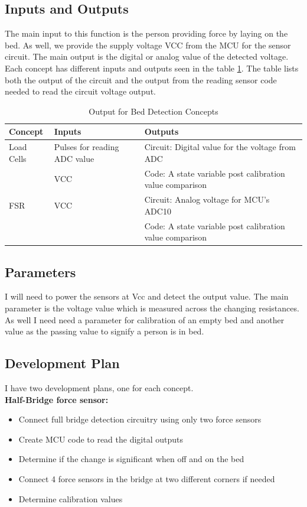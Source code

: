 \documentclass[11pt]{article}
\begin{document}
\subsection*{Inputs and Outputs}
The main input to this function is the person providing force by laying on the bed.
As well, we provide the supply voltage VCC from the MCU for the sensor circuit.
The main output is the digital or analog value of the detected voltage.
Each concept has different inputs and outputs seen in the table \ref{concepoutputs}.
The table lists both the output of the circuit and the output from the reading sensor code needed to read the circuit voltage output. 
\begin{table}[H]
	\caption{Output for Bed Detection Concepts}
	\label{concepoutputs}
	\begin{tabular}{|l|l|l|}
		\hline
		Concept & Inputs & Outputs\\
		\hline
		Load Cells & Pulses for reading ADC value& Circuit: Digital value for the voltage from ADC\\
		&VCC & Code: A state variable post calibration value comparison\\ 
		\hline
		FSR &VCC& Circuit: Analog voltage for MCU's ADC10  \\ 
		 & &Code: A state variable post calibration value comparison\\
		 \hline
	\end{tabular}
\end{table}

\subsection*{Parameters}
I will need to power the sensors at Vcc and detect the output value. 
The main parameter is the voltage value which is measured across the changing resistances. 
As well I need need a parameter for calibration of an empty bed and another value as the passing value to signify a person is in bed. 

\subsection*{Development Plan}
I have two development plans, one for each concept. \\

\textbf{Half-Bridge force sensor:}
\begin{itemize}
	\item Connect full bridge detection circuitry using only two force sensors 
	\item Create MCU code to read the digital outputs 
	\item Determine if the change is significant when off and on the bed
	\item Connect 4 force sensors in the bridge at two different corners if needed
	\item Determine calibration values 
\end{itemize}
\end{document}
